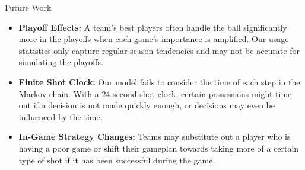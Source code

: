 \documentclass{beamer}
\begin{document}
\begin{frame}{Future Work}
\begin{itemize}
    \item \textbf{Playoff Effects:} A team's best players often handle the ball significantly more in the playoffs when each game's importance is amplified. Our usage statistics only capture regular season tendencies and may not be accurate for simulating the playoffs. 
    \item \textbf{Finite Shot Clock:} Our model fails to consider the time of each step in the Markov chain. With a 24-second shot clock, certain possessions might time out if a decision is not made quickly enough, or decisions may even be influenced by the time.
    \item \textbf{In-Game Strategy Changes:} Teams may substitute out a player who is having a poor game or shift their gameplan towards taking more of a certain type of shot if it has been successful during the game.

\end{itemize}
\end{frame}
\end{document}
